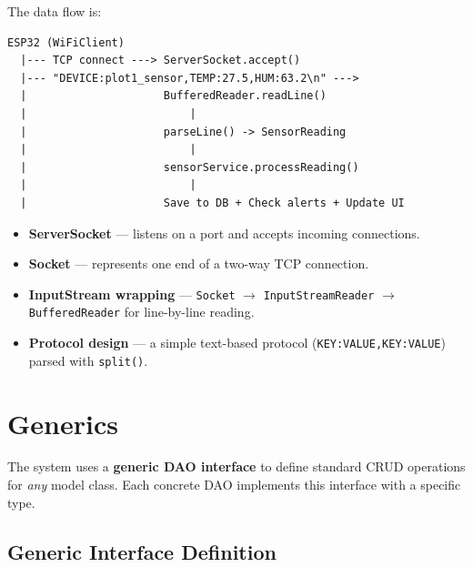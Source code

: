 \documentclass[12pt, a4paper]{report}
\begin{document}
The data flow is:

\begin{tcolorbox}[colback=codebg, colframe=gray, fontupper=\ttfamily\small\color{codetext}]
\begin{verbatim}
ESP32 (WiFiClient)
  |--- TCP connect ---> ServerSocket.accept()
  |--- "DEVICE:plot1_sensor,TEMP:27.5,HUM:63.2\n" --->
  |                     BufferedReader.readLine()
  |                         |
  |                     parseLine() -> SensorReading
  |                         |
  |                     sensorService.processReading()
  |                         |
  |                     Save to DB + Check alerts + Update UI
\end{verbatim}
\end{tcolorbox}

\begin{tcolorbox}[notebox, title={Socket Programming Concepts}]
\begin{itemize}[noitemsep]
    \item \textbf{ServerSocket} --- listens on a port and accepts incoming connections.
    \item \textbf{Socket} --- represents one end of a two-way TCP connection.
    \item \textbf{InputStream wrapping} --- \texttt{Socket} $\rightarrow$ \texttt{InputStreamReader} $\rightarrow$ \texttt{BufferedReader} for line-by-line reading.
    \item \textbf{Protocol design} --- a simple text-based protocol (\texttt{KEY:VALUE,KEY:VALUE}) parsed with \texttt{split()}.
\end{itemize}
\end{tcolorbox}


\section{Generics}

The system uses a \textbf{generic DAO interface} to define standard CRUD operations for \emph{any} model class. Each concrete DAO implements this interface with a specific type.

\subsection{Generic Interface Definition}
\end{document}
